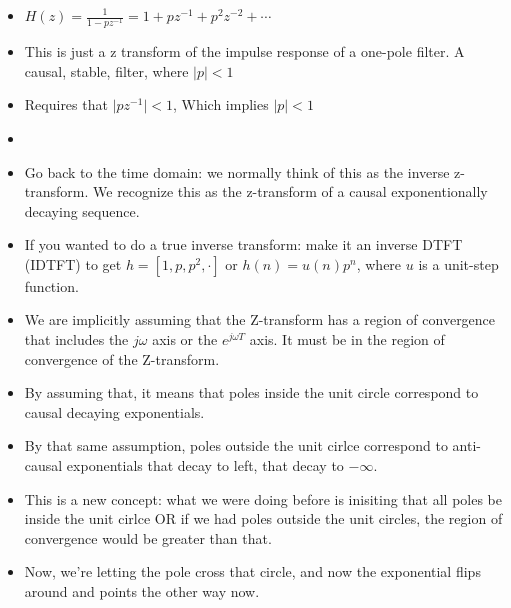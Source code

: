 \begin{itemize}
\item{
$H(z) =  \frac{1}{1 - pz^{-1}} = 1 + pz^{-1} + p^2z^{-2} + \cdots$
}
\item{
This is just a z transform of the impulse response of a one-pole filter. A
causal, stable, filter, where $\vert p \vert < 1$
}
\item{
Requires that $\vert pz^{-1} \vert < 1$, Which implies
$\vert p \vert < 1$
}
\item{
}
\item{
Go back to the time domain: we normally think of this as the inverse
z-transform. We recognize this as the z-transform of a causal 
exponentionally decaying sequence. 
}
\item{
If you wanted to do a true inverse transform: make it an inverse DTFT 
(IDTFT) to get $h = [1, p, p^2, \cdot]$ or $h(n) = u(n) p^{n}$, 
where $u$ is a unit-step function.
}
\item{
We are implicitly assuming that the Z-transform has a region 
of convergence that includes the $j\omega$ axis or the $e^{j\omega T}$ axis.
It must be in the region of convergence of the Z-transform.
}
\item{
By assuming that, it means that poles inside the unit circle
correspond to causal decaying exponentials.
}
\item{
By that same assumption, poles outside the unit cirlce correspond
to anti-causal exponentials that decay to left, that decay to $-\infty$.
}
\item{
This is a new concept: what we were doing before is inisiting that 
all poles be inside the unit cirlce OR if we had poles outside the unit
circles, the region of convergence would be greater than that. 
}
\item{
Now, we're letting the pole cross that circle, and now the exponential
flips around and points the other way now.
}
\end{itemize}
